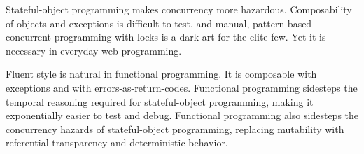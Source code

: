 \documentclass[11pt]{article}
\begin{document}
Stateful-object programming makes concurrency more hazardous.
Composability of objects and exceptions is difficult to test, and
manual, pattern-based concurrent programming with locks is a dark
art for the elite few. Yet it is necessary in everyday web
programming.

Fluent style is natural in functional programming. It is composable
with exceptions and with errors-as-return-codes. Functional
programming sidesteps the temporal reasoning required for
stateful-object programming, making it exponentially easier to test
and debug. Functional programming also sidesteps the concurrency
hazards of stateful-object programming, replacing mutability with
referential transparency and deterministic behavior.
\end{document}
